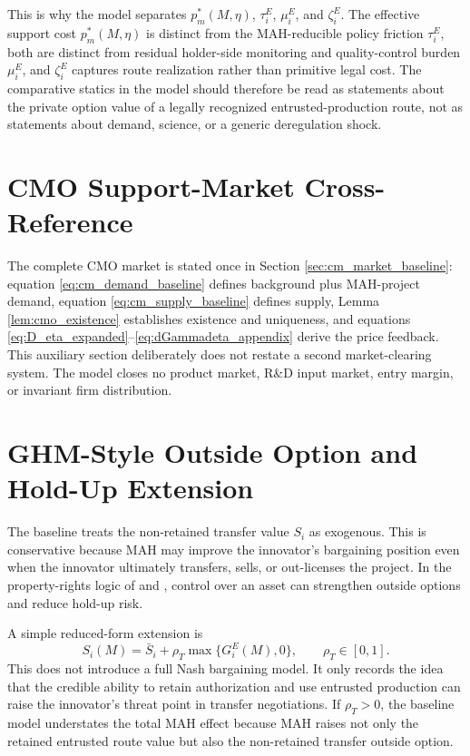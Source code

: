 \documentclass[12pt]{article}
\newcommand{\1}{\mathbf{1}}
\begin{document}
This is why the model separates $p_m^*(M,\eta)$, $\tau_i^E$, $\mu_i^E$, and $\zeta_i^E$. The effective support cost $p_m^*(M,\eta)$ is distinct from the MAH-reducible policy friction $\tau_i^E$, both are distinct from residual holder-side monitoring and quality-control burden $\mu_i^E$, and $\zeta_i^E$ captures route realization rather than primitive legal cost. The comparative statics in the model should therefore be read as statements about the private option value of a legally recognized entrusted-production route, not as statements about demand, science, or a generic deregulation shock.

\section{CMO Support-Market Cross-Reference}
\label{sec:appendix_cm_market}

The complete CMO market is stated once in Section \ref{sec:cm_market_baseline}: equation \eqref{eq:cm_demand_baseline} defines background plus MAH-project demand, equation \eqref{eq:cm_supply_baseline} defines supply, Lemma \ref{lem:cmo_existence} establishes existence and uniqueness, and equations \eqref{eq:D_eta_expanded}--\eqref{eq:dGammadeta_appendix} derive the price feedback. This auxiliary section deliberately does not restate a second market-clearing system. The model closes no product market, R\&D input market, entry margin, or invariant firm distribution.

\section{GHM-Style Outside Option and Hold-Up Extension}
\label{sec:ghm_extension}

The baseline treats the non-retained transfer value $S_i$ as exogenous. This is conservative because MAH may improve the innovator's bargaining position even when the innovator ultimately transfers, sells, or out-licenses the project. In the property-rights logic of \citet{GrossmanHart1986} and \citet{HartMoore1990}, control over an asset can strengthen outside options and reduce hold-up risk.

A simple reduced-form extension is
\begin{equation}
    S_i(M)=\bar S_i+\rho_T \max\{G_i^E(M),0\},
    \qquad \rho_T\in[0,1].
    \label{eq:Si_hold_up_extension}
\end{equation}
This does not introduce a full Nash bargaining model. It only records the idea that the credible ability to retain authorization and use entrusted production can raise the innovator's threat point in transfer negotiations. If $\rho_T>0$, the baseline model understates the total MAH effect because MAH raises not only the retained entrusted route value but also the non-retained transfer outside option.
\end{document}
